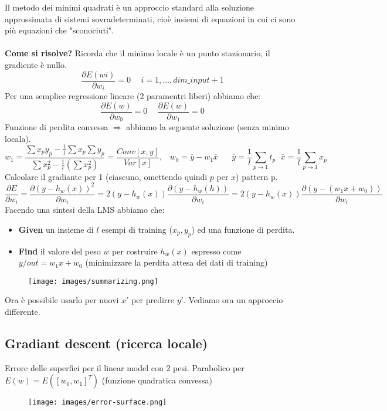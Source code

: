 \hspace{-15pt}Il metodo dei minimi quadrati è un approccio standard alla soluzione approssimata di sistemi sovradeterminati, cioè insiemi di equazioni
in cui ci sono più equazioni che "sconociuti".\\\\
\textbf{Come si risolve?} Ricorda che il minimo locale è un punto stazionario, il gradiente è nullo.
$$\frac{\partial E(wi)}{\partial w_i} = 0 \hspace{15pt} i = 1, \dots, dim\_input + 1$$
Per una semplice regressione lineare (2 paramentri liberi) abbiamo che:
$$\frac{\partial E(w)}{\partial w_0} = 0 \hspace{15pt} \frac{\partial E(w)}{\partial w_1} = 0$$
Funzione di perdita convessa $\Rightarrow$ abbiamo la seguente soluzione (senza minimo locala).
$$w_1 = \frac{\sum x_p y_p - \frac{1}{l}\sum x_p \sum y_p}{\sum x_p^2 - \frac{1}{l} (\sum x_p^2)} = \frac{Conv[x, y]}{Var[x]}, \hspace{10pt} w_0 = \overline{y} - w_1 \overline{x} \hspace{20pt} \overline{y} = \frac{1}{l}\sum_{p \to 1} t_p  \hspace{7pt} \overline{x} = \frac{1}{l}\sum_{p\to 1}x_p$$
Calcolare il gradiante per 1 (ciascuno, omettendo quindi $p$ per $x$) pattern p. 
$$\frac{\partial E}{\partial w_i} = \frac{\partial (y - h_w(x))^2}{\partial w_i} = 2(y - h_w(x))\frac{\partial (y - h_w(h))}{\partial w_i} = 2(y - h_w(x))\frac{\partial (y - (w_1 x + w_0))}{\partial w_i}$$
Facendo una sintesi della LMS abbiamo che:
\begin{itemize}
    \item \textbf{Given} un insieme di $l$ esempi di training ($x_p, y_p$) ed una funzione di perdita.
    \item \textbf{Find} il valore del peso $w$ per costruire $h_w(x)$ espresso come $y/out = w_1 x + w_0$ (minimizzare la perdita attesa dei dati di training)
\end{itemize}
\begin{figure}[h!]
    \centering
    \texttt{[image: images/summarizing.png]}
\end{figure}
Ora è possibile usarlo per nuovi $x'$ per predirre $y'$. Vediamo ora un approccio differente.

\subsection{Gradiant descent (ricerca locale)}
Errore delle superfici per il linear model con 2 pesi. Parabolico per $E(w) = E([w_0, w_1]^T)$ (funzione quadratica convessa)
\begin{figure}[h!]
    \centering
    \texttt{[image: images/error-surface.png]}
\end{figure}

